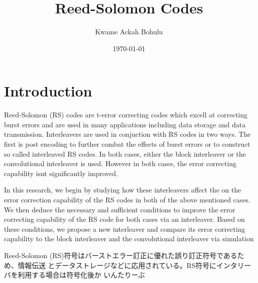 \documentclass[fontsize=12pt]{article}
\title{Reed-Solomon Codes }
\author{Kwame Ackah Bohulu}
\date{\today}
\begin{document}
\maketitle

\newpage
\section{Introduction}
Reed-Solomon (RS) codes are t-error correcting codes which excell at correcting burst errors
 and are used in many applications including data storage and data transmission.
 Interleavers are used in conjuction with RS codes in two ways. The first is post encoding to 
 further combat the effects of burst errors or to construct so called interleaved RS codes.
 In both cases, either the block interleaver or the convolutional interleaver is used. However
 in both cases, the error correcting capability isnt significantly improved.  
 
In this research, we begin by studying how these interleavers affect the 
on the error correction capability of the RS codes in both of the above mentioned cases. 
We then deduce the 
 necessary and sufficient conditions to improve the error correcting capability of the RS 
 code for both cases via an interleaver. Based on  these conditions, we propose a new interleaver and 
 compare its error correcting capability to the block interleaver and the convolutional 
 interleaver via simulation
 
 Reed-Solomon (RS)符号はバーストエラー訂正に優れた誤り訂正符号であるため、情報伝送
とデータストレージなどに応用されている。RS符号にインタリーバを利用する場合は符号化後か
 いんたりーぶ
\end{document}
